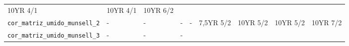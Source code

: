\documentclass[a4paper,dvipsnames]{tufte-book}
\begin{document}
\begin{longtable}[]{@{}lllllllll@{}}
\begin{minipage}[t]{0.07\columnwidth}
10YR 4/1\strut
\end{minipage} & \begin{minipage}[t]{0.07\columnwidth}\raggedright\strut
10YR 4/1\strut
\end{minipage} & \begin{minipage}[t]{0.06\columnwidth}\raggedright\strut
10YR 6/2\strut
\end{minipage}\tabularnewline
\begin{minipage}[t]{0.21\columnwidth}\raggedright\strut
\texttt{cor\_matriz\_umido\_munsell\_2}\strut
\end{minipage} & \begin{minipage}[t]{0.06\columnwidth}\raggedright\strut
-\strut
\end{minipage} & \begin{minipage}[t]{0.06\columnwidth}\raggedright\strut
-\strut
\end{minipage} & \begin{minipage}[t]{0.07\columnwidth}\raggedright\strut
-\strut
\end{minipage} & \begin{minipage}[t]{0.07\columnwidth}\raggedright\strut
-\strut
\end{minipage} & \begin{minipage}[t]{0.07\columnwidth}\raggedright\strut
7,5YR 5/2\strut
\end{minipage} & \begin{minipage}[t]{0.07\columnwidth}\raggedright\strut
10YR 5/2\strut
\end{minipage} & \begin{minipage}[t]{0.07\columnwidth}\raggedright\strut
10YR 5/2\strut
\end{minipage} & \begin{minipage}[t]{0.06\columnwidth}\raggedright\strut
10YR 7/2\strut
\end{minipage}\tabularnewline
\begin{minipage}[t]{0.21\columnwidth}\raggedright\strut
\texttt{cor\_matriz\_umido\_munsell\_3}\strut
\end{minipage} & \begin{minipage}[t]{0.06\columnwidth}\raggedright\strut
-\strut
\end{minipage} & \begin{minipage}[t]{0.06\columnwidth}\raggedright\strut
-\strut
\end{minipage} & \begin{minipage}[t]{0.07\columnwidth}\raggedright\strut
-\strut
\end{minipage} & \begin{minipage}[t]{0.07\columnwidth}\raggedright\strut

\end{minipage}
\end{longtable}
\end{document}
